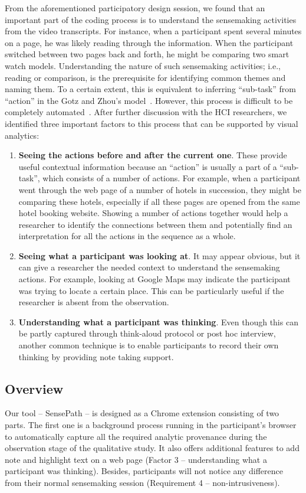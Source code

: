 From the aforementioned participatory design session, we found that an important part of the coding process is to understand the sensemaking activities from the video transcripts. For instance, when a participant spent several minutes on a page, he was likely reading through the information. When the participant switched between two pages back and forth, he might be comparing two smart watch models. Understanding the nature of such sensemaking activities; i.e., reading or comparison, is the prerequisite for identifying common themes and naming them. To a certain extent, this is equivalent to inferring ``sub-task'' from ``action'' in the Gotz and Zhou's model~\cite{Gotz2009}. However, this process is difficult to be completely automated~\cite{Dou2009}. After further discussion with the HCI researchers, we identified three important factors to this process that can be supported by visual analytics:
\begin{enumerate}
	\item \textbf{Seeing the actions before and after the current one}. These provide useful contextual information because an ``action'' is usually a part of a ``sub-task'', which consists of a number of actions. For example, when a participant went through the web page of a number of hotels in succession, they might be comparing these hotels, especially if all these pages are opened from the same hotel booking website. Showing a number of actions together would help a researcher to identify the connections between them and potentially find an interpretation for all the actions in the sequence as a whole.
	\item \textbf{Seeing what a participant was looking at}. It may appear obvious, but it can give a researcher the needed context to understand the sensemaking actions. For example, looking at Google Maps may indicate the participant was trying to locate a certain place. This can be particularly useful if the researcher is absent from the observation.
	\item \textbf{Understanding what a participant was thinking}. Even though this can be partly captured through think-aloud protocol or post hoc interview, another common technique is to enable participants to record their own thinking by providing note taking support.
\end{enumerate}

\subsection{Overview}
Our tool -- SensePath -- is designed as a Chrome extension consisting of two parts. The first one is a background process running in the participant's browser to automatically capture all the required analytic provenance during the observation stage of the qualitative study. It also offers additional features to add note and highlight text on a web page (Factor 3 -- understanding what a participant was thinking). Besides, participants will not notice any difference from their normal sensemaking session (Requirement 4 -- non-intrusiveness).

